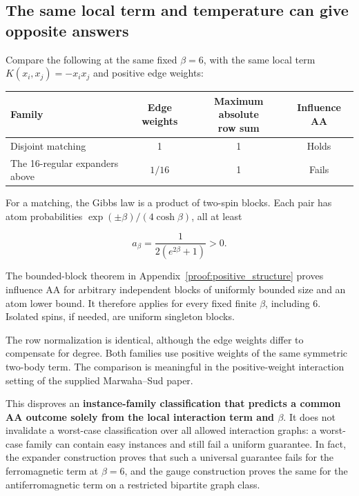 \subsection{The same local term and temperature can give opposite
answers}\label{proof:local_interactions:the-same-local-term-and-temperature-can-give-opposite-answers}

Compare the following at the same fixed \(\beta =6\), with the same
local term \(K(x_i,x_j)=-x_ix_j\) and positive edge weights:

\begin{center}
\begin{tabularx}{\linewidth}{@{}Xccc@{}}
\toprule
Family & Edge weights & \shortstack{Maximum absolute\\row sum} & Influence AA \\
\midrule
Disjoint matching & 1 & 1 & Holds \\
The 16-regular expanders above & \(1/16\) & 1 & Fails \\
\bottomrule
\end{tabularx}
\end{center}

For a matching, the Gibbs law is a product of two-spin blocks. Each pair
has atom probabilities \(\exp (\pm \beta )/(4\cosh  \beta )\), all at
least

\[
a_\beta=\frac1{2(e^{2\beta}+1)}>0.
\]

The bounded-block theorem in Appendix~\ref{proof:positive_structure} proves
influence AA for arbitrary independent blocks of uniformly bounded size
and an atom lower bound. It therefore applies for every fixed finite
\(\beta\), including 6. Isolated spins, if needed, are uniform singleton
blocks.

The row normalization is identical, although the edge weights differ to
compensate for degree. Both families use positive weights of the same
symmetric two-body term. The comparison is meaningful in the
positive-weight interaction setting of the supplied Marwaha--Sud paper.

This disproves an \textbf{instance-family classification that predicts a
common AA outcome solely from the local interaction term and \(\beta\)}.
It does not invalidate a worst-case classification over all allowed
interaction graphs: a worst-case family can contain easy instances and
still fail a uniform guarantee. In fact, the expander construction
proves that such a universal guarantee fails for the ferromagnetic term
at \(\beta =6\), and the gauge construction proves the same for the
antiferromagnetic term on a restricted bipartite graph class.

